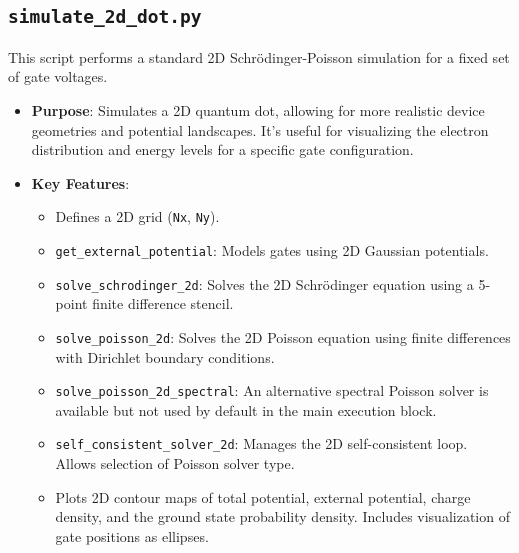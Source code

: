 \documentclass{article}
\begin{document}
\subsection{\texttt{simulate\_2d\_dot.py}}
This script performs a standard 2D Schrödinger-Poisson simulation for a fixed set of gate voltages.
\begin{itemize}
    \item \textbf{Purpose}: Simulates a 2D quantum dot, allowing for more realistic device geometries and potential landscapes. It's useful for visualizing the electron distribution and energy levels for a specific gate configuration.
    \item \textbf{Key Features}:
        \begin{itemize}
            \item Defines a 2D grid (\texttt{Nx}, \texttt{Ny}).
            \item \texttt{get\_external\_potential}: Models gates using 2D Gaussian potentials.
            \item \texttt{solve\_schrodinger\_2d}: Solves the 2D Schrödinger equation using a 5-point finite difference stencil.
            \item \texttt{solve\_poisson\_2d}: Solves the 2D Poisson equation using finite differences with Dirichlet boundary conditions.
            \item \texttt{solve\_poisson\_2d\_spectral}: An alternative spectral Poisson solver is available but not used by default in the main execution block.
            \item \texttt{self\_consistent\_solver\_2d}: Manages the 2D self-consistent loop. Allows selection of Poisson solver type.
            \item Plots 2D contour maps of total potential, external potential, charge density, and the ground state probability density. Includes visualization of gate positions as ellipses.
        \end{itemize}
\end{itemize}
\end{document}
